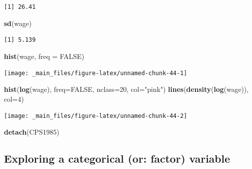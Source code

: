 \documentclass[
]{book}
\newenvironment{Shaded}{\begin{snugshade}}{\end{snugshade}}
\newcommand{\DataTypeTok}[1]{\textcolor[rgb]{0.13,0.29,0.53}{#1}}
\newcommand{\DecValTok}[1]{\textcolor[rgb]{0.00,0.00,0.81}{#1}}
\newcommand{\KeywordTok}[1]{\textcolor[rgb]{0.13,0.29,0.53}{\textbf{#1}}}
\newcommand{\NormalTok}[1]{#1}
\newcommand{\OtherTok}[1]{\textcolor[rgb]{0.56,0.35,0.01}{#1}}
\newcommand{\StringTok}[1]{\textcolor[rgb]{0.31,0.60,0.02}{#1}}
\begin{document}
\begin{verbatim}
[1] 26.41
\end{verbatim}

\begin{Shaded}
\begin{Highlighting}[]
\KeywordTok{sd}\NormalTok{(wage)}
\end{Highlighting}
\end{Shaded}

\begin{verbatim}
[1] 5.139
\end{verbatim}

\begin{Shaded}
\begin{Highlighting}[]
\KeywordTok{hist}\NormalTok{(wage, }\DataTypeTok{freq =} \OtherTok{FALSE}\NormalTok{)}
\end{Highlighting}
\end{Shaded}

\begin{center}\texttt{[image: \_main\_files/figure-latex/unnamed-chunk-44-1]} \end{center}

\begin{Shaded}
\begin{Highlighting}[]
\KeywordTok{hist}\NormalTok{(}\KeywordTok{log}\NormalTok{(wage), }\DataTypeTok{freq=}\OtherTok{FALSE}\NormalTok{, }\DataTypeTok{nclass=}\DecValTok{20}\NormalTok{, }\DataTypeTok{col=}\StringTok{"pink"}\NormalTok{)}
\KeywordTok{lines}\NormalTok{(}\KeywordTok{density}\NormalTok{(}\KeywordTok{log}\NormalTok{(wage)), }\DataTypeTok{col=}\DecValTok{4}\NormalTok{)}
\end{Highlighting}
\end{Shaded}

\begin{center}\texttt{[image: \_main\_files/figure-latex/unnamed-chunk-44-2]} \end{center}

\begin{Shaded}
\begin{Highlighting}[]
\KeywordTok{detach}\NormalTok{(CPS1985)}
\end{Highlighting}
\end{Shaded}

\hypertarget{exploring-a-categorical-or-factor-variable}{%
\subsection{Exploring a categorical (or: factor) variable}\label{exploring-a-categorical-or-factor-variable}}
\end{document}

